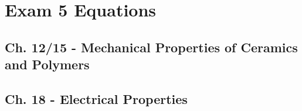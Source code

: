 \section{Exam 5 Equations}
	\subsection{Ch. 12/15 - Mechanical Properties of Ceramics and Polymers}
	\subsection{Ch. 18 - Electrical Properties}